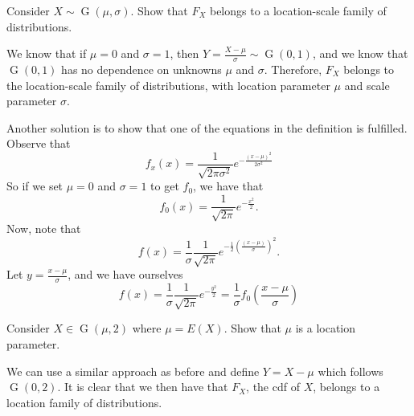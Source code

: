 \documentclass[notoc,notitlepage]{tufte-book}
\DeclareMathOperator{\Gau}{G }
\begin{document}
\begin{eg}[Example 2.13]
  Consider $X \sim \Gau(\mu, \sigma)$. Show that $F_X$ belongs to a location-scale family of distributions.

  We know that if $\mu = 0$ and $\sigma = 1$, then $Y = \frac{X - \mu}{\sigma} \sim \Gau(0, 1)$, and we know that $\Gau(0, 1)$ has no dependence on unknowns $\mu$ and $\sigma$. Therefore, $F_X$ belongs to the location-scale family of distributions, with location parameter $\mu$ and scale parameter $\sigma$.

  Another solution is to show that one of the equations in the definition is fulfilled. Observe that
  \begin{equation*}
    f_x(x) = \frac{1}{\sqrt{2 \pi \sigma^2}} e^{- \frac{(x - \mu)^2}{2 \sigma^2}}
  \end{equation*}
  So if we set $\mu = 0$ and $\sigma = 1$ to get $f_0$, we have that
  \begin{equation*}
    f_0(x) = \frac{1}{\sqrt{2 \pi}} e^{- \frac{x^2}{2}}.
  \end{equation*}
  Now, note that
  \begin{equation*}
    f(x) = \frac{1}{\sigma} \frac{1}{\sqrt{2 \pi}} e^{- \frac{1}{2} \left(\frac{(x - \mu)}{\sigma}\right)^2}.
  \end{equation*}
  Let $y = \frac{x - \mu}{\sigma}$, and we have ourselves
  \begin{equation*}
    f(x) = \frac{1}{\sigma} \frac{1}{\sqrt{2 \pi}} e^{- \frac{y^2}{2}} = \frac{1}{\sigma} f_0 (\frac{x - \mu}{\sigma})
  \end{equation*}
\end{eg}

\begin{eg}[Example 2.14]
  Consider $X \in \Gau(\mu, 2)$ where $\mu = E(X)$. Show that $\mu$ is a location parameter.

  We can use a similar approach as before and define $Y = X - \mu$ which follows $\Gau(0, 2)$. It is clear that we then have that $F_X$, the cdf of $X$, belongs to a location family of distributions.
\end{eg}
\end{document}
